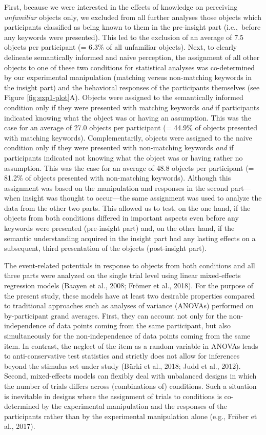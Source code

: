 \documentclass[
  english,
  doc,12pt,twoside,floatsintext]{apa7}
\begin{document}
First, because we were interested in the effects of knowledge on perceiving \emph{unfamiliar} objects only, we excluded from all further analyses those objects which participants classified as being known to them in the pre-insight part (i.e.,~before any keywords were presented). This led to the exclusion of an average of 7.5 objects per participant (= 6.3\% of all unfamiliar objects). Next, to clearly delineate semantically informed and naive perception, the assignment of all other objects to one of these two conditions for statistical analyses was co-determined by our experimental manipulation (matching versus non-matching keywords in the insight part) and the behavioral responses of the participants themselves (see Figure \ref{fig:exp1-plot}A). Objects were assigned to the semantically informed condition only if they were presented with matching keywords \emph{and} if participants indicated knowing what the object was or having an assumption. This was the case for an average of 27.0 objects per participant (= 44.9\% of objects presented with matching keywords). Complementarily, objects were assigned to the naive condition only if they were presented with non-matching keywords \emph{and} if participants indicated not knowing what the object was or having rather no assumption. This was the case for an average of 48.8 objects per participant (= 81.2\% of objects presented with non-matching keywords). Although this assignment was based on the manipulation and responses in the second part---when insight was thought to occur---the same assignment was used to analyze the data from the other two parts. This allowed us to test, on the one hand, if the objects from both conditions differed in important aspects even before any keywords were presented (pre-insight part) and, on the other hand, if the semantic understanding acquired in the insight part had any lasting effects on a subsequent, third presentation of the objects (post-insight part).

The event-related potentials in response to objects from both conditions and all three parts were analyzed on the single trial level using linear mixed-effects regression models (Baayen et al., 2008; Frömer et al., 2018). For the purpose of the present study, these models have at least two desirable properties compared to traditional approaches such as analyses of variance (ANOVAs) performed on by-participant grand averages. First, they can account not only for the non-independence of data points coming from the same participant, but also simultaneously for the non-independence of data points coming from the same item. In contrast, the neglect of the item as a random variable in ANOVAs leads to anti-conservative test statistics and strictly does not allow for inferences beyond the stimulus set under study (Bürki et al., 2018; Judd et al., 2012). Second, mixed-effects models can flexibly deal with unbalanced designs in which the number of trials differs across (combinations of) conditions. Such a situation is inevitable in designs where the assignment of trials to conditions is co-determined by the experimental manipulation and the responses of the participants rather than by the experimental manipulation alone (e.g., Fröber et al., 2017).
\end{document}

